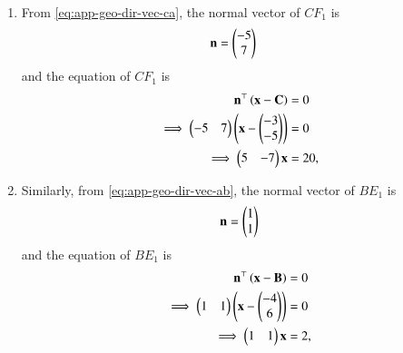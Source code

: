 \\ \solution
\begin{enumerate}
\item 
	From 
		\eqref{eq:app-geo-dir-vec-ca},
the normal vector of $CF_1$ is 
\begin{align}
\mathbf{n}&=\begin{pmatrix}-5\\7\end{pmatrix} 
\end{align}
and the equation of $CF_1$ is
\begin{align}
\mathbf{n}^{\top}\left(\mathbf{x}-\mathbf{C}\right)&=0 \\
\implies 
\begin{pmatrix}-5 & 7\end{pmatrix}\left(\mathbf{x}-\begin{pmatrix}-3\\-5\end{pmatrix}\right)&=0  \\
	\implies \begin{pmatrix}5 & -7\end{pmatrix}\mathbf{x}&=20
		\label{eq:app-geo-alt-cf},
\end{align}
\item Similarly, 
	from 
		\eqref{eq:app-geo-dir-vec-ab},
the normal vector of $BE_1$ is 
\begin{align}
\mathbf{n}= \begin{pmatrix}1 \\1\end{pmatrix}
\end{align}
and the equation of  $BE_1$ is
\begin{align}
\mathbf{n}^{\top}\left(\mathbf{x}-\mathbf{B}\right)&=0 \\
	\implies \begin{pmatrix}1 & 1\end{pmatrix}\left(\mathbf{x}-\begin{pmatrix}-4\\6\end{pmatrix}\right)&=0 \\
	\implies \begin{pmatrix}1 & 1\end{pmatrix}\mathbf{x}&=2
		\label{eq:app-geo-alt-be},
\end{align}
\end{enumerate}


